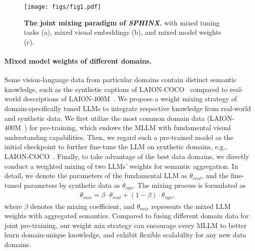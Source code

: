 \documentclass{article} \usepackage{iclr2024_conference,times}
\begin{document}
\begin{figure*}[t!]
  \centering
\texttt{[image: figs/fig1.pdf]}
   \caption{\textbf{The joint mixing paradigm of \textcolor{Goldenrod3}{\textbf{\textit{SPHINX}}}.} with mixed tuning tasks (a), mixed visual embeddings (b), and mixed model weights (c).}
    \label{fig1}
\end{figure*}

\paragraph{Mixed model weights of different domains.}
Some vision-language data from particular domains contain distinct semantic knowledge, such as the synthetic captions of LAION-COCO~\citep{laioncoco} compared to real-world descriptions of LAION-400M~\citep{schuhmann2021laion}. We propose a weight mixing strategy of domain-specifically tuned LLMs to integrate respective knowledge from real-world and synthetic data.
We first utilize the most common domain data (LAION-400M~\citep{schuhmann2021laion}) for pre-training, which endows the MLLM with fundamental visual understanding capabilities. Then, we regard such a pre-trained model as the initial checkpoint to further fine-tune the LLM on synthetic domains, e.g., LAION-COCO~\citep{laioncoco}. Finally, to take advantage of the best data domains, we directly conduct a weighted mixing of two LLMs' weights for semantic aggregation.
In detail, we denote the parameters of the fundamental LLM as $\theta_{real}$, and the fine-tuned parameters by synthetic data as $\theta_{syn}$. The mixing process is formulated as
\begin{align}
    \theta_{mix} = \beta\cdot\theta_{real} + (1-\beta)\cdot\theta_{syn},
\end{align}
where $\beta$ denotes the mixing coefficient, and $\theta_{mix}$ represents the mixed LLM weights with aggregated semantics. 
Compared to fusing different domain data for joint pre-training, our weight mix strategy can encourage every MLLM to better learn domain-unique knowledge, and exhibit flexible scalability for any new data domains.
\end{document}
